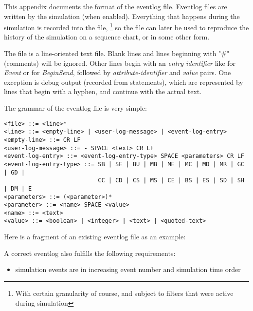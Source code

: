 \label{cha:eventlog-file-format}

This appendix documents the format of the eventlog file. Eventlog
files are written by the simulation (when enabled). Everything
that happens during the simulation is recorded into the file,
  \footnote{With certain granularity of course, and subject to
  filters that were active during simulation}
so the file can later be used to reproduce the history of the
simulation on a sequence chart, or in some other form.

The file is a line-oriented text file. Blank lines and lines beginning
with "\#" (comments) will be ignored. Other lines begin with an
\textit{entry identifier} like  for \textit{Event} or
 for \textit{BeginSend}, followed by \textit{attribute-identifier}
and \textit{value} pairs. One exception is debug output
(recorded from  statements), which are represented
by lines that begin with a hyphen, and continue with the actual text.

The grammar of the eventlog file is very simple:
\begin{verbatim}
<file> ::= <line>*
<line> ::= <empty-line> | <user-log-message> | <event-log-entry>
<empty-line> ::= CR LF
<user-log-message> ::= - SPACE <text> CR LF
<event-log-entry> ::= <event-log-entry-type> SPACE <parameters> CR LF
<event-log-entry-type> ::= SB | SE | BU | MB | ME | MC | MD | MR | GC | GD |
                           CC | CD | CS | MS | CE | BS | ES | SD | SH | DM | E
<parameters> ::= (<parameter>)*
<parameter> ::= <name> SPACE <value>
<name> ::= <text>
<value> ::= <boolean> | <integer> | <text> | <quoted-text>
\end{verbatim}

Here is a fragment of an existing eventlog file as an example:


A correct eventlog also fulfills the following requirements:
\begin{itemize}
   \item simulation events are in increasing event number and simulation time order
\end{itemize}

